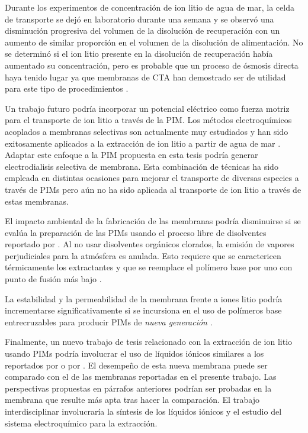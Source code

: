 Durante los experimentos de concentración de ion litio de agua de mar, la celda de transporte se dejó en laboratorio durante una semana y se observó una disminución progresiva del volumen de la disolución de recuperación con un aumento de similar proporción en el volumen de la disolución de alimentación. No se determinó si el ion litio presente en la disolución de recuperación había aumentado su concentración, pero es probable que un proceso de ósmosis directa haya tenido lugar ya que membranas de \ac{CTA} han demostrado ser de utilidad para este tipo de procedimientos \citep{Li2018}.

Un trabajo futuro podría incorporar un potencial eléctrico como fuerza motriz para el transporte de ion litio a través de la \ac{PIM}. Los métodos electroquímicos acoplados a membranas selectivas son actualmente muy estudiados y han sido exitosamente aplicados a la extracción de ion litio a partir de agua de mar \citep{LIU2019}. Adaptar este enfoque a la PIM propuesta en esta tesis podría generar electrodialisis selectiva de membrana. Esta combinación de técnicas ha sido empleada en distintas ocasiones para mejorar el transporte de diversas especies a través de PIMs \citep{Kaya2016, See2013} pero aún no ha sido aplicada al transporte de ion litio a través de estas membranas.

El impacto ambiental de la fabricación de las membranas podría disminuirse si se evalúa la preparación de las PIMs usando el proceso libre de disolventes reportado por \citet{Vera2019}. Al no usar disolventes orgánicos clorados, la emisión de vapores perjudiciales para la atmósfera es anulada. Esto requiere que se caractericen térmicamente los extractantes y que se reemplace el polímero base por uno con punto de fusión más bajo \citet{Vera2019}.

La estabilidad y la permeabilidad de la membrana frente a iones litio podría incrementarse significativamente si se incursiona en el uso de polímeros base entrecruzables para producir PIMs de \textit{nueva generación} \citep{OBRYAN2017}.

Finalmente, un nuevo trabajo de tesis relacionado con la extracción de ion litio usando PIMs podría involucrar el uso de líquidos iónicos similares a los reportados por \citet{ZANTE2019} o por \citet{Shi2020}. El desempeño de esta nueva membrana puede ser comparado con el de las membranas reportadas en el presente trabajo. Las perspectivas propuestas en párrafos anteriores podrían ser probadas en la membrana que resulte más apta tras hacer la comparación. El trabajo interdisciplinar involucraría la síntesis de los líquidos iónicos y el estudio del sistema electroquímico para la extracción.
\clearpage
{}
